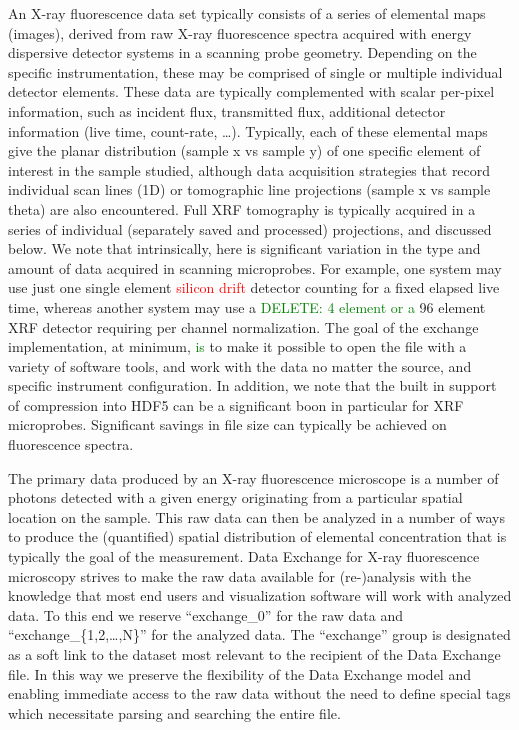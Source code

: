 \documentclass[pdf]{iucr}              %
\begin{document}
An X-ray fluorescence data set typically consists of a series of elemental maps (images), derived from raw X-ray fluorescence spectra acquired with energy dispersive detector systems in a scanning probe geometry. Depending on the specific instrumentation, these may be comprised of single or multiple individual detector elements. These data are typically complemented with scalar per-pixel information, such as incident flux, transmitted flux, additional detector information (live time,
count-rate, \ldots). Typically, each of these elemental maps give the planar distribution (sample x vs sample y) of one specific element of interest in the sample studied, although data acquisition strategies that record individual scan lines (1D) or tomographic line projections (sample x vs sample theta) are also encountered. Full XRF tomography is typically acquired in a series of individual (separately saved and processed) projections, and discussed below. We note that intrinsically,
here is significant variation in the type and amount of data acquired in scanning microprobes. For example, one system may use just one single element \textcolor{red}{silicon drift} detector counting for a fixed elapsed live time, whereas another system may use a \textcolor{green}{DELETE: 4 element or a} 96 element XRF detector requiring per channel normalization. The goal of the exchange implementation, at minimum, \textcolor{green}{is} to make it possible to open the file with a variety of software tools, and work with the data no matter the source, and specific instrument configuration. In addition, we note that the built in support of compression into HDF5 can be a significant boon in particular for XRF microprobes. Significant savings in file size can typically be achieved on fluorescence spectra. 

The primary data produced by an X-ray fluorescence microscope is a number of photons detected with a given energy originating from a particular spatial location on the sample. This raw data can then be analyzed in a number of ways to produce the (quantified) spatial distribution of elemental concentration that is typically the goal of the measurement. Data Exchange for X-ray fluorescence microscopy strives to make the raw data available for (re-)analysis with the knowledge that most
end users and visualization software will work with analyzed data. To this end we reserve ``exchange\_0'' for the raw data and ``exchange\_\{1,2,\ldots,N\}'' for the analyzed data. The ``exchange'' group is designated as a soft link to the dataset most relevant to the recipient of the Data Exchange file. In this way we preserve the flexibility of the Data Exchange model and enabling immediate access to the raw data without the need to define special tags which necessitate parsing and
searching the entire file.
\end{document}
